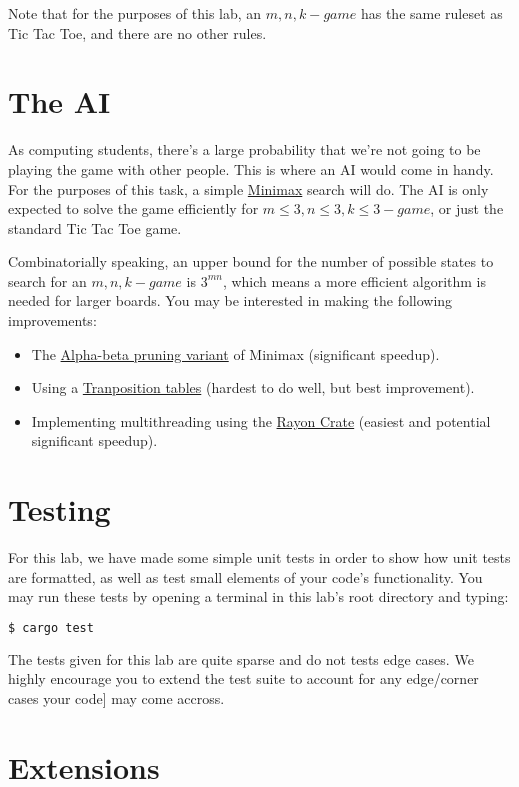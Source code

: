 \documentclass{report}
\begin{document}
Note that for the purposes of this lab, an $m,n,k-game$ has the same ruleset as 
Tic Tac Toe, and there are no other rules.

\section*{The AI}
As computing students, there's a large probability that we're not going to be
playing the game with other people. This is where an AI would come in handy. 
For the purposes of this task, a simple \href{https://en.wikipedia.org/wiki/Minimax}{Minimax}
search will do. The AI is only expected to solve the game efficiently for
$m \le 3, n \le 3, k \le 3-game$, or just the standard Tic Tac Toe game. 

Combinatorially speaking, an upper bound for the number of possible states to search 
for an $m,n,k-game$ is $3^{mn}$, which means a more efficient algorithm is needed 
for larger boards. You may be interested in making the following improvements: 
\begin{itemize}
    \item The \href{https://en.wikipedia.org/wiki/Alpha%E2%80%93beta_pruning}{Alpha-beta pruning variant} of Minimax (significant speedup).
    \item Using a \href{https://en.wikipedia.org/wiki/Transposition_table}{Tranposition tables} (hardest to do well, but best improvement).
    \item Implementing multithreading using the \href{https://crates.io/crates/rayon}{Rayon Crate} (easiest and potential significant speedup).
\end{itemize}

\section*{Testing}
For this lab, we have made some simple unit tests in order to show how unit tests
are formatted, as well as test small elements of your code's functionality.
You may run these tests by opening a terminal in this lab's root directory and typing:
\begin{lstlisting}[language=Bash]
$ cargo test
\end{lstlisting}

The tests given for this lab are quite sparse and do not tests edge cases. We highly
encourage you to extend the test suite to account for any edge/corner cases your code]
may come accross.

\section*{Extensions}
\end{document}
